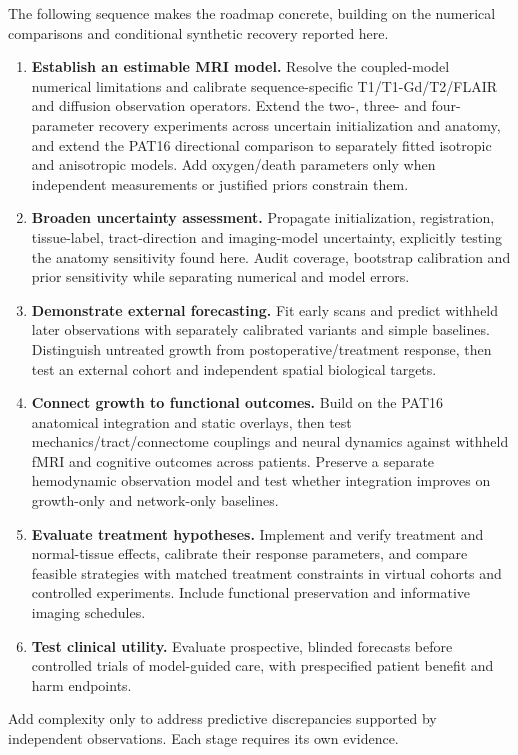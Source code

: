 The following sequence makes the roadmap concrete, building on the numerical comparisons and conditional synthetic recovery reported here.
\begin{enumerate}
\item \textbf{Establish an estimable MRI model.} Resolve the coupled-model numerical limitations and calibrate sequence-specific T1/T1-Gd/T2/FLAIR and diffusion observation operators. Extend the two-, three- and four-parameter recovery experiments across uncertain initialization and anatomy, and extend the PAT16 directional comparison to separately fitted isotropic and anisotropic models. Add oxygen/death parameters only when independent measurements or justified priors constrain them.
\item \textbf{Broaden uncertainty assessment.} Propagate initialization, registration, tissue-label, tract-direction and imaging-model uncertainty, explicitly testing the anatomy sensitivity found here. Audit coverage, bootstrap calibration and prior sensitivity while separating numerical and model errors.
\item \textbf{Demonstrate external forecasting.} Fit early scans and predict withheld later observations with separately calibrated variants and simple baselines. Distinguish untreated growth from postoperative/treatment response, then test an external cohort and independent spatial biological targets.
\item \textbf{Connect growth to functional outcomes.} Build on the PAT16 anatomical integration and static overlays, then test mechanics/tract/connectome couplings and neural dynamics against withheld fMRI and cognitive outcomes across patients. Preserve a separate hemodynamic observation model and test whether integration improves on growth-only and network-only baselines.
\item \textbf{Evaluate treatment hypotheses.} Implement and verify treatment and normal-tissue effects, calibrate their response parameters, and compare feasible strategies with matched treatment constraints in virtual cohorts and controlled experiments. Include functional preservation and informative imaging schedules.
\item \textbf{Test clinical utility.} Evaluate prospective, blinded forecasts before controlled trials of model-guided care, with prespecified patient benefit and harm endpoints.
\end{enumerate}
Add complexity only to address predictive discrepancies supported by independent observations. Each stage requires its own evidence.

